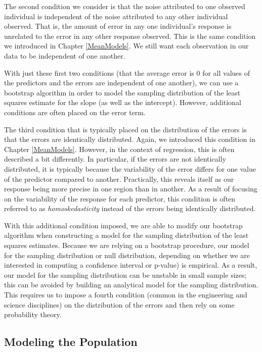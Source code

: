 \documentclass[]{book}
\theoremstyle{plain}
\theoremstyle{mydefn}
\theoremstyle{myexmpl}
\theoremstyle{remark}
\begin{document}
The second condition we consider is that the noise attributed to one
observed individual is independent of the noise attributed to any other
individual observed. That is, the amount of error in any one
individual's response is unrelated to the error in any other response
observed. This is the same condition we introduced in Chapter
\ref{MeanModels}. We still want each observation in our data to be
independent of one another.

With just these first two conditions (that the average error is 0 for
all values of the predictors and the errors are independent of one
another), we can use a bootstrap algorithm in order to model the
sampling distribution of the least squares estimate for the slope (as
well as the intercept). However, additional conditions are often placed
on the error term.

The third condition that is typically placed on the distribution of the
errors is that the errors are identically distributed. Again, we
introduced this condition in Chapter \ref{MeanModels}. However, in the
context of regression, this is often described a bit differently. In
particular, if the errors are not identically distributed, it is
typically because the variability of the error differs for one value of
the predictor compared to another. Practically, this reveals itself as
our response being more precise in one region than in another. As a
result of focusing on the variability of the response for each
predictor, this condition is often referred to as
\emph{homoskedasticity} instead of the errors being identically
distributed.

With this additional condition imposed, we are able to modify our
bootstrap algorithm when constructing a model for the sampling
distribution of the least squares estimates. Because we are relying on a
bootstrap procedure, our model for the sampling distribution or null
distribution, depending on whether we are interested in computing a
confidence interval or p-value) is empirical. As a result, our model for
the sampling distribution can be unstable in small sample sizes; this
can be avoided by building an analytical model for the sampling
distribution. This requires us to impose a fourth condition (common in
the engineering and science disciplines) on the distribution of the
errors and then rely on some probability theory.

\subsection{Modeling the Population}\label{modeling-the-population}
\end{document}
